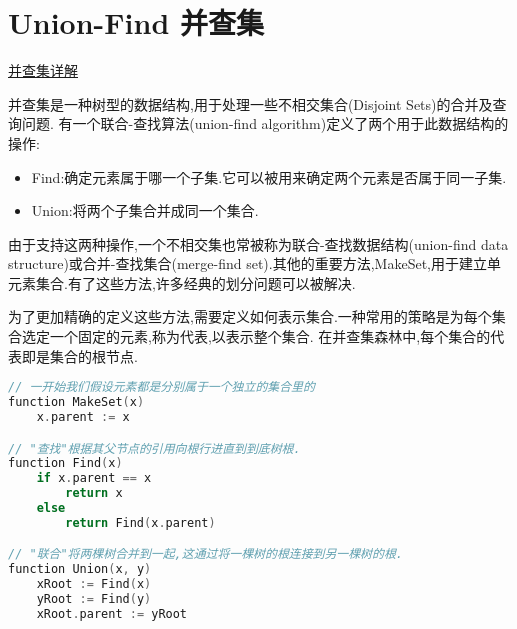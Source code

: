\chapter{Union-Find 并查集}
\href{https://blog.csdn.net/the_best_man/article/details/62416938}{并查集详解}

并查集是一种树型的数据结构,用于处理一些不相交集合(Disjoint Sets)的合并及查询问题.
有一个联合-查找算法(union-find algorithm)定义了两个用于此数据结构的操作:
\begin{itemize}
\item Find:确定元素属于哪一个子集.它可以被用来确定两个元素是否属于同一子集.
\item Union:将两个子集合并成同一个集合.
\end{itemize}
由于支持这两种操作,一个不相交集也常被称为联合-查找数据结构(union-find data structure)或合并-查找集合(merge-find set).其他的重要方法,MakeSet,用于建立单元素集合.有了这些方法,许多经典的划分问题可以被解决.

为了更加精确的定义这些方法,需要定义如何表示集合.一种常用的策略是为每个集合选定一个固定的元素,称为代表,以表示整个集合.
在并查集森林中,每个集合的代表即是集合的根节点.

\begin{lstlisting}[language = C]
// 一开始我们假设元素都是分别属于一个独立的集合里的
function MakeSet(x)
	x.parent := x

// "查找"根据其父节点的引用向根行进直到到底树根.
function Find(x)
	if x.parent == x
		return x
	else
		return Find(x.parent)

// "联合"将两棵树合并到一起,这通过将一棵树的根连接到另一棵树的根.
function Union(x, y)
	xRoot := Find(x)
	yRoot := Find(y)
	xRoot.parent := yRoot
\end{lstlisting}

